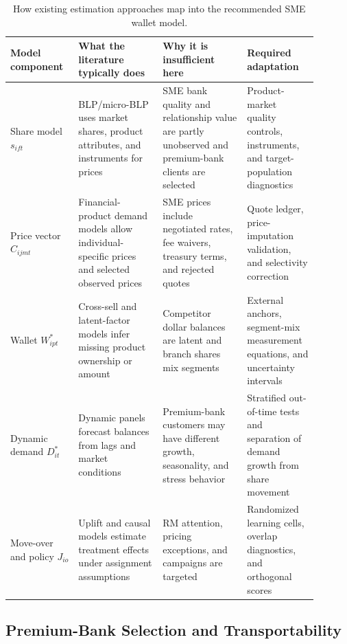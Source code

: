 \documentclass[11pt]{article}
\begin{document}
\begin{table}[htbp]
\centering
\footnotesize
\begin{tabular}{@{}
  >{\raggedright\arraybackslash}p{0.19\linewidth}
  >{\raggedright\arraybackslash}p{0.25\linewidth}
  >{\raggedright\arraybackslash}p{0.25\linewidth}
  >{\raggedright\arraybackslash}p{0.20\linewidth}
@{}}
\toprule
Model component & What the literature typically does & Why it is insufficient here & Required adaptation \\
\midrule
Share model $s_{ift}$ & BLP/micro-BLP uses market shares, product attributes,
and instruments for prices & SME bank quality and relationship value are
partly unobserved and premium-bank clients are selected & Product-market
quality controls, instruments, and target-population diagnostics \\
Price vector $C_{ijmt}$ & Financial-product demand models allow individual-
specific prices and selected observed prices & SME prices include negotiated
rates, fee waivers, treasury terms, and rejected quotes & Quote ledger,
price-imputation validation, and selectivity correction \\
Wallet $W_{ipt}^{*}$ & Cross-sell and latent-factor models infer missing
product ownership or amount & Competitor dollar balances are latent and branch
shares mix segments & External anchors, segment-mix measurement equations, and
uncertainty intervals \\
Dynamic demand $D_{it}^{*}$ & Dynamic panels forecast balances from lags and
market conditions & Premium-bank customers may have different growth,
seasonality, and stress behavior & Stratified out-of-time tests and separation
of demand growth from share movement \\
Move-over and policy $J_{io}$ & Uplift and causal models estimate treatment
effects under assignment assumptions & RM attention, pricing exceptions, and
campaigns are targeted & Randomized learning cells, overlap diagnostics, and
orthogonal scores \\
\bottomrule
\end{tabular}
\caption{How existing estimation approaches map into the recommended SME wallet model.}
\label{tab:estimation_literature_map}
\end{table}

\subsection{Premium-Bank Selection and Transportability}
\end{document}
